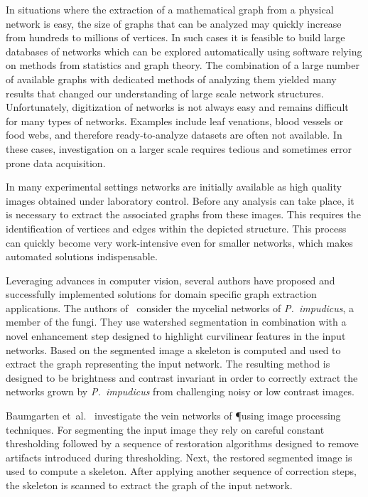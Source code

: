 	In situations where the extraction of a mathematical graph from a physical network is easy, the size of graphs that can be analyzed may quickly increase from hundreds to millions of vertices. In such cases it is feasible to build large databases of networks which can be explored automatically using software relying on methods from statistics and graph theory. The combination of a large number of available graphs with dedicated methods of analyzing them yielded many results that changed our understanding of large scale network structures. Unfortunately, digitization of networks is not always easy and remains difficult for many types of networks. Examples include \eg leaf venations, blood vessels or food webs, and therefore ready-to-analyze datasets are often not available. In these cases, investigation on a larger scale requires tedious and sometimes error prone data acquisition.

	In many experimental settings networks are initially available as high quality images obtained under laboratory control. Before any analysis can take place, it is necessary to extract the associated graphs from these images. This requires the identification of vertices and edges within the depicted structure. This process can quickly become very work-intensive even for smaller networks, which makes automated solutions indispensable. 

	Leveraging advances in computer vision, several authors have proposed and successfully implemented solutions for domain specific graph extraction applications. The authors of~\cite{obara2012bioimage,obara2012contrast} consider the mycelial networks of \emph{P.~impudicus}, a member of the fungi. They use watershed segmentation in combination with a novel enhancement step designed to highlight curvilinear features in the input networks. Based on the segmented image a skeleton is computed and used to extract the graph representing the input network. The resulting method is designed to be brightness and contrast invariant in order to correctly extract the networks grown by \emph{P.~impudicus} from challenging noisy or low contrast images.
	
	Baumgarten et~al.~\cite{baumgarten2010detection,baumgarten2012computational} investigate the vein networks of \P using image processing techniques. For segmenting the input image they rely on careful constant thresholding followed by a sequence of restoration algorithms designed to remove artifacts introduced during thresholding. Next, the restored segmented image is used to compute a skeleton. After applying another sequence of correction steps, the skeleton is scanned to extract the graph of the input network.
 
